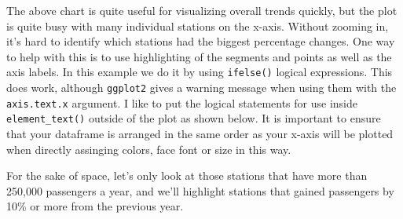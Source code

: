 \documentclass[
  letterpaper,
  DIV=11,
  numbers=noendperiod]{scrreprt}
\begin{document}
The above chart is quite useful for visualizing overall trends quickly,
but the plot is quite busy with many individual stations on the x-axis.
Without zooming in, it's hard to identify which stations had the biggest
percentage changes. One way to help with this is to use highlighting of
the segments and points as well as the axis labels. In this example we
do it by using \texttt{ifelse()} logical expressions. This does work,
although \texttt{ggplot2} gives a warning message when using them with
the \texttt{axis.text.x} argument. I like to put the logical statements
for use inside \texttt{element\_text()} outside of the plot as shown
below. It is important to ensure that your dataframe is arranged in the
same order as your x-axis will be plotted when directly assinging
colors, face font or size in this way.

For the sake of space, let's only look at those stations that have more
than 250,000 passengers a year, and we'll highlight stations that gained
passengers by 10\% or more from the previous year.
\end{document}
